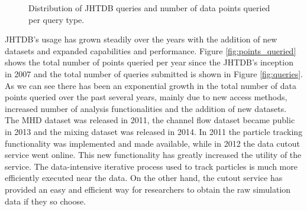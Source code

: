 \documentclass[10pt,twocolumn]{article}
\begin{document}
\begin{figure}
\centering
{}
\caption{Distribution of JHTDB queries and number of data points queried per query type.}
\label{fig:query_types}
\end{figure}

JHTDB's usage has grown steadily over the years with the addition of new datasets and expanded capabilities and performance. Figure \ref{fig:points_queried}
shows the total number of points queried per year since the JHTDB's inception in 2007 and the total number of queries submitted is shown in Figure
\ref{fig:queries}. As we can see there has been an exponential growth in the total number of data points queried over the past several years, mainly due to
new access methods, increased number of analysis functionalities and the addition of new datasets. 
The MHD dataset was released in 2011, the channel flow dataset
became public in 2013 and the mixing dataset was released in 2014. In 2011 the particle tracking functionality was implemented and made available, while
in 2012 the data cutout service went online. This new functionality has greatly increased the utility of the service. The data-intensive iterative process used to
track particles is much more efficiently executed near the data. On the other hand, the cutout service has provided an easy and efficient way for researchers to
obtain the raw simulation data if they so choose. 
\end{document}
